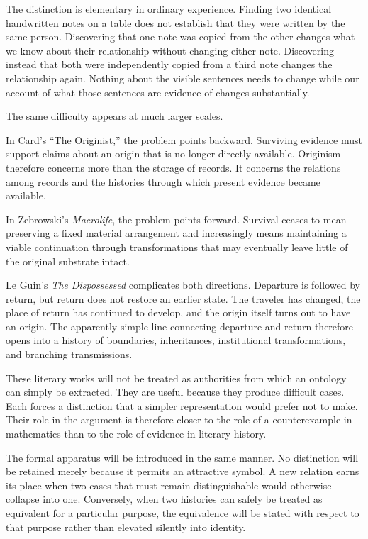 \documentclass[
  11pt,
  a4paper,
  DIV=12,
  BCOR=0mm,
  parskip=half-
]{scrartcl}
\theoremstyle{definition}
\theoremstyle{plain}
\theoremstyle{remark}
\begin{document}
The distinction is elementary in ordinary experience. Finding two identical
handwritten notes on a table does not establish that they were written by the
same person. Discovering that one note was copied from the other changes what
we know about their relationship without changing either note. Discovering
instead that both were independently copied from a third note changes the
relationship again. Nothing about the visible sentences needs to change while
our account of what those sentences are evidence of changes substantially.

The same difficulty appears at much larger scales.

In Card's ``The Originist,'' the problem points backward. Surviving evidence
must support claims about an origin that is no longer directly available.
Originism therefore concerns more than the storage of records. It concerns the
relations among records and the histories through which present evidence became
available.

In Zebrowski's \emph{Macrolife}, the problem points forward. Survival ceases to
mean preserving a fixed material arrangement and increasingly means maintaining
a viable continuation through transformations that may eventually leave little
of the original substrate intact.

Le Guin's \emph{The Dispossessed} complicates both directions. Departure is
followed by return, but return does not restore an earlier state. The traveler
has changed, the place of return has continued to develop, and the origin
itself turns out to have an origin. The apparently simple line connecting
departure and return therefore opens into a history of boundaries,
inheritances, institutional transformations, and branching transmissions.

These literary works will not be treated as authorities from which an ontology
can simply be extracted. They are useful because they produce difficult cases.
Each forces a distinction that a simpler representation would prefer not to
make. Their role in the argument is therefore closer to the role of a
counterexample in mathematics than to the role of evidence in literary
history.

The formal apparatus will be introduced in the same manner. No distinction
will be retained merely because it permits an attractive symbol. A new
relation earns its place when two cases that must remain distinguishable would
otherwise collapse into one. Conversely, when two histories can safely be
treated as equivalent for a particular purpose, the equivalence will be stated
with respect to that purpose rather than elevated silently into identity.
\end{document}
